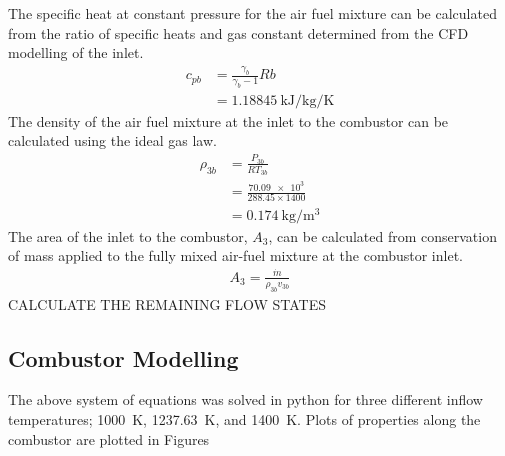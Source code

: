 \documentclass[a4paper]{article}
\begin{document}
The specific heat at constant pressure for the air fuel mixture can be calculated from the ratio of specific heats and gas constant determined from the CFD modelling of the inlet.
\begin{align}
    c_{pb} &= \frac{\gamma_b}{\gamma_b - 1}Rb\\
    &= \SI{1.18845}{\kJ\per\kg\per\K}
\end{align}
The density of the air fuel mixture at the inlet to the combustor can be calculated using the ideal gas law.
\begin{align}
    \rho_{3b} &= \frac{P_{3b}}{RT_{3b}}\\
    &= \frac{\num{70.09e3}}{288.45 \times 1400}\\
    &= \SI{0.174}{\kg\per\m\cubed}
\end{align}
The area of the inlet to the combustor, \(A_3\), can be calculated from conservation of mass applied to the fully mixed air-fuel mixture at the combustor inlet.
\begin{align}
    A_3 = \frac{\dot{m}}{\rho_{3b} v_{3b}}
\end{align}
CALCULATE THE REMAINING FLOW STATES


\subsection{Combustor Modelling}
The above system of equations was solved in python for three different inflow temperatures; 1000~K, 1237.63~K, and 1400~K. Plots of properties along the combustor are plotted in Figures
\end{document}
